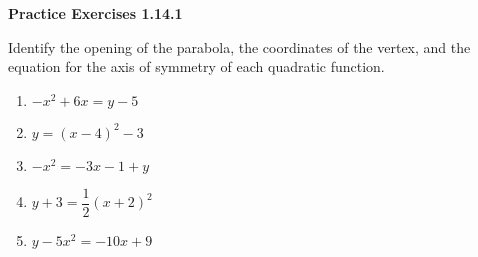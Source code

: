 \noindent\textbf{Practice Exercises 1.14.1}


Identify the opening of the parabola, the coordinates of the vertex, and the equation for the axis of symmetry of each quadratic function. 
\begin{multicols}{2}
\begin{enumerate}[label = \color{blue}\arabic*. ]
\item $ -x^{2} + 6x = y - 5 $ 
\item $ y = (x - 4)^{2} - 3 $
\item $ -x^{2} = -3x - 1 + y $
\item $ y + 3 = \dfrac{1}{2}(x + 2)^{2} $ 
\item $ y - 5x^{2} = -10x + 9 $
\end{enumerate}
\end{multicols} 

